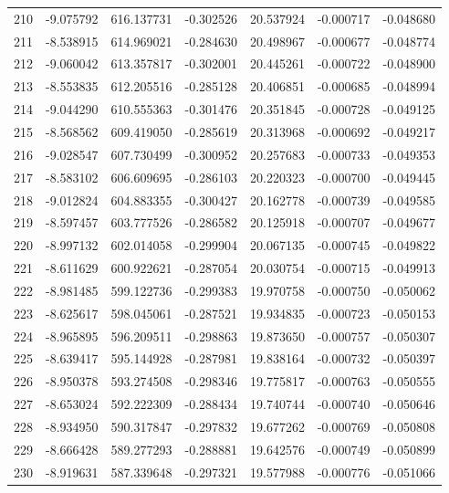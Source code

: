 \begin{tabular}{rrrrrrr}
 210 &  -9.075792 &  616.137731 & -0.302526 &  20.537924 &  -0.000717 & -0.048680 \\
 211 &  -8.538915 &  614.969021 & -0.284630 &  20.498967 &  -0.000677 & -0.048774 \\
 212 &  -9.060042 &  613.357817 & -0.302001 &  20.445261 &  -0.000722 & -0.048900 \\
 213 &  -8.553835 &  612.205516 & -0.285128 &  20.406851 &  -0.000685 & -0.048994 \\
 214 &  -9.044290 &  610.555363 & -0.301476 &  20.351845 &  -0.000728 & -0.049125 \\
 215 &  -8.568562 &  609.419050 & -0.285619 &  20.313968 &  -0.000692 & -0.049217 \\
 216 &  -9.028547 &  607.730499 & -0.300952 &  20.257683 &  -0.000733 & -0.049353 \\
 217 &  -8.583102 &  606.609695 & -0.286103 &  20.220323 &  -0.000700 & -0.049445 \\
 218 &  -9.012824 &  604.883355 & -0.300427 &  20.162778 &  -0.000739 & -0.049585 \\
 219 &  -8.597457 &  603.777526 & -0.286582 &  20.125918 &  -0.000707 & -0.049677 \\
 220 &  -8.997132 &  602.014058 & -0.299904 &  20.067135 &  -0.000745 & -0.049822 \\
 221 &  -8.611629 &  600.922621 & -0.287054 &  20.030754 &  -0.000715 & -0.049913 \\
 222 &  -8.981485 &  599.122736 & -0.299383 &  19.970758 &  -0.000750 & -0.050062 \\
 223 &  -8.625617 &  598.045061 & -0.287521 &  19.934835 &  -0.000723 & -0.050153 \\
 224 &  -8.965895 &  596.209511 & -0.298863 &  19.873650 &  -0.000757 & -0.050307 \\
 225 &  -8.639417 &  595.144928 & -0.287981 &  19.838164 &  -0.000732 & -0.050397 \\
 226 &  -8.950378 &  593.274508 & -0.298346 &  19.775817 &  -0.000763 & -0.050555 \\
 227 &  -8.653024 &  592.222309 & -0.288434 &  19.740744 &  -0.000740 & -0.050646 \\
 228 &  -8.934950 &  590.317847 & -0.297832 &  19.677262 &  -0.000769 & -0.050808 \\
 229 &  -8.666428 &  589.277293 & -0.288881 &  19.642576 &  -0.000749 & -0.050899 \\
 230 &  -8.919631 &  587.339648 & -0.297321 &  19.577988 &  -0.000776 & -0.051066 \\

\end{tabular}
